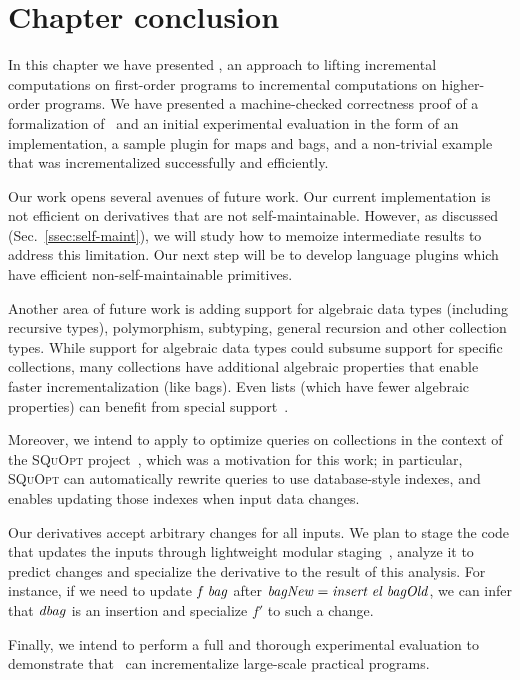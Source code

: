 \section{Chapter conclusion}
\label{ssec:future}
In this chapter we have presented \ILC, an approach to lifting incremental computations
on first-order programs to incremental computations on higher-order
programs. We have presented a machine-checked correctness proof 
of a formalization of \ILC\ and an initial experimental evaluation
in the form of an implementation, a sample plugin for maps and bags,
and a non-trivial example that was incrementalized successfully and
efficiently. 

Our work opens several avenues of future work. Our current implementation
is not efficient on derivatives that are not self-maintainable.
However, as discussed
(Sec.~\ref{ssec:self-maint}), we will study how
to memoize intermediate results to address this limitation. Our next
step will be to develop language plugins which
have efficient non-self-maintainable primitives.

Another area of future work is adding support for algebraic data
types (including recursive types), polymorphism, subtyping, general recursion
and other collection types. While support for algebraic data
types could subsume support for specific collections, many
collections have additional algebraic properties that enable faster
incrementalization (like bags). Even lists (which have fewer algebraic properties)
can benefit from special support~\citep{Maier2013}.

Moreover, we intend to apply \ILC{} to optimize queries on
collections in the context of the \textsc{SQuOpt}
project~\citep{GiarrussoAOSD13}, which was a motivation for this
work; in particular, \textsc{SQuOpt} can automatically rewrite
queries to use database-style indexes, and \ILC{} enables
updating those indexes when input data changes.

\begin{oldSec}
Our derivatives accept arbitrary changes for all inputs. We plan
to stage the code that updates the inputs through lightweight
modular staging~\citep{rompf2010lightweight}, analyze it to
predict changes and specialize the derivative to the result of
this analysis. For instance, if we need to update $\mathit{f} \;
\mathit{bag}$ after $\mathit{bagNew} = \mathit{insert} \; \mathit{el} \;
\mathit{bagOld}$, we can infer that $\mathit{dbag}$ is an insertion
and specialize $f'$ to such a change.
\end{oldSec}

Finally, we intend to perform a full and thorough experimental evaluation
to demonstrate that \ILC\ can incrementalize large-scale practical programs.
